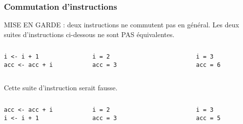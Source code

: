 \documentclass[10pt]{beamer}
\begin{document}
\begin{frame}[fragile]
  \frametitle{Commutation d'instructions}
\begin{alertblock}{MISE EN GARDE : deux instructions ne commutent pas en général.}
  Les deux suites d’instructions ci-dessous ne sont PAS équivalentes.
\end{alertblock}


\begin{columns}[c]
  \begin{column}{0.25\textwidth}
  \begin{lstlisting}[style=editor]
i <- i + 1
acc <- acc + i
  \end{lstlisting}
\end{column}
\begin{column}{0.25\textwidth}
  \begin{lstlisting}
i = 2
acc = 3
\end{lstlisting}
\end{column}
\begin{column}{0.1\textwidth}
  \RUN
\end{column}
\begin{column}{0.25\textwidth}
  \begin{lstlisting}
i = 3
acc = 6
\end{lstlisting}
\end{column}
\end{columns}

Cette suite d'instruction serait fausse.
\begin{columns}[c]
  \begin{column}{0.25\textwidth}
  \begin{lstlisting}[style=editor]
acc <- acc + i
i <- i + 1
\end{lstlisting}
\end{column}
\begin{column}{0.25\textwidth}
  \begin{lstlisting}
i = 2
acc = 3
\end{lstlisting}
\end{column}
\begin{column}{0.1\textwidth}
  \RUN
\end{column}
\begin{column}{0.25\textwidth}
  \begin{lstlisting}
i = 3
acc = 5
\end{lstlisting}
\end{column}
\end{columns}


\end{frame}
\end{document}
